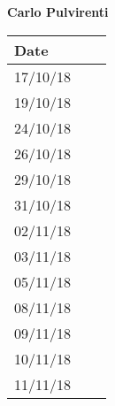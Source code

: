 \documentclass[../main.tex]{subfiles}
\begin{document}
\begin{center}
	{\bf Carlo Pulvirenti}
	\vspace{2mm}

		\begin{tabular}{p{1.3cm}|p{1.8cm}|p{6.7cm}}
			\hline
			\bf Date & \bf \makebox[1.8cm][c]{Hours} & \bf \makebox[6.7cm][c]{Description} \\
			\hline
			17/10/18 & \makebox[1.8cm][c]{2h} & \makebox[6.7cm][c]{Introduction}\\
			19/10/18 & \makebox[1.8cm][c]{3h} & \makebox[6.7cm][c]{Goals, Requirements, Domain assumptions}\\
			24/10/18 & \makebox[1.8cm][c]{4h} & \makebox[6.7cm][c]{Goals, Requirements, Domain assumptions}\\
			26/10/18 & \makebox[1.8cm][c]{2h} & \makebox[6.7cm][c]{Purpose, Scope}\\
			29/10/18 & \makebox[1.8cm][c]{6h} & \makebox[6.7cm][c]{Use Cases}\\
			31/10/18 & \makebox[1.8cm][c]{6h} & \makebox[6.7cm][c]{Use Cases, Scenarios}\\
			02/11/18 & \makebox[1.8cm][c]{4h} & \makebox[6.7cm][c]{Scenarios}\\
			03/11/18 & \makebox[1.8cm][c]{1h} & \makebox[6.7cm][c]{UML Class \& State Machine Diagrams}\\
			05/11/18 & \makebox[1.8cm][c]{4h} & \makebox[6.7cm][c]{Scenarios, Sequence Diagrams}\\
			08/11/18 & \makebox[1.8cm][c]{2h} & \makebox[6.7cm][c]{Sequence Diagramm, Alloy}\\
			09/11/18 & \makebox[1.8cm][c]{2h} & \makebox[6.7cm][c]{Sequence Diagram, Revisioning}\\
			10/11/18 & \makebox[1.8cm][c]{2h} & \makebox[6.7cm][c]{Revisioning}\\
			11/11/18 & \makebox[1.8cm][c]{4h} & \makebox[6.7cm][c]{Revisioning}\\
		\end{tabular}
\end{center}

\vspace{1cm}

\newpage
\end{document}
